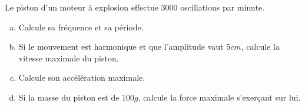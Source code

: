 %
%
    Le piston d'un moteur à explosion effectue 3000 oscillations par minute.
    \begin{enumerate}[a)]
        \item Calcule sa fréquence et sa période.
        \item Si le mouvement est harmonique et que l'amplitude vaut \(5cm\), calcule la vitesse maximale du piston.
        \item Calcule son accélération maximale.
        \item Si la masse du piston est de \(100g\), calcule la force maximale s'exerçant sur lui.
    \end{enumerate}
